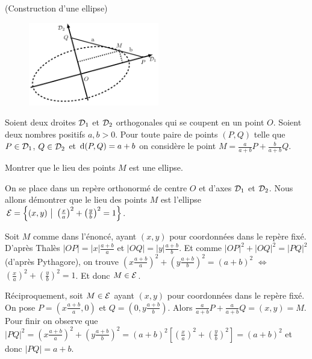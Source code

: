 \documentclass[a4paper,12pt,reqno]{amsart}
\begin{document}
\begin{exo} (Construction d'une ellipse)

  \begin{figure}
    \centering\vspace{-7mm}
    \includegraphics[width=57mm]{img_ellipse_segment}
  \end{figure}
  Soient deux droites $\mathcal{D}_{1}$ et $\mathcal{D}_{2}$ orthogonales qui se coupent en un point $O$. Soient deux nombres positifs $a,b>0$. Pour toute paire de points $(P,Q)$ telle que $P \in \mathcal{D}_{1}$, $Q \in \mathcal{D}_{2}$ et $\operatorname{d}(P,Q)=a+b$ on considère le point $M=\frac{a}{a+b}P+\frac{b}{a+b}Q$.

  Montrer que le lieu des points $M$ est une ellipse.

\end{exo}

\begin{solution}

  On se place dans un repère orthonormé de centre $O$ et d'axes $\mathcal{D}_{1}$ et $\mathcal{D}_{2}$. Nous allons démontrer que le lieu des points $M$ est l'ellipse $\ens{E}=\left\{(x,y)\ \big|\ \left(\frac{x}{a}\right)^{2} + \left(\frac{y}{b}\right)^{2} = 1 \right\}$.

  Soit $M$ comme dans l'énoncé, ayant $(x,y)$ pour coordonnées dans le repère fixé. D'après Thalès $|OP|=|x|\frac{a+b}{a}$ et $|OQ|=|y|\frac{a+b}{b}$. Et comme $|OP|^{2}+|OQ|^{2}=|PQ|^{2}$ (d'après Pythagore), on trouve $\left(x\frac{a+b}{a}\right)^{2}+\left(y\frac{a+b}{b}\right)^{2} = (a+b)^{2}$ $\Leftrightarrow$ $\left(\frac{x}{a}\right)^{2}+\left(\frac{y}{b}\right)^{2} = 1$. Et donc $M \in \mathcal{E}$.

  Réciproquement, soit $M \in \mathcal{E}$ ayant $(x,y)$ pour coordonnées dans le repère fixé.
  On pose $P = (x\frac{a+b}{a}, 0)$ et $Q = (0, y\frac{a+b}{b})$. Alors $\frac{a}{a+b}P+\frac{a}{a+b}Q = (x,y) = M$. Pour finir on observe que $|PQ|^{2}=\left(x\frac{a+b}{a}\right)^{2}+\left(y\frac{a+b}{b}\right)^{2} = (a+b)^{2}\left[\left(\frac{x}{a}\right)^{2} + \left(\frac{y}{b}\right)^{2}\right] = (a+b)^{2}$ et donc $|PQ|=a+b$.

\end{solution}
\end{document}
